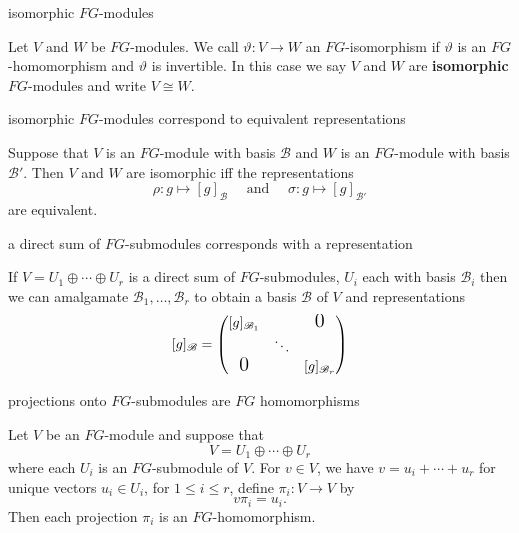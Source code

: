 \documentclass[avery5371,grid]{flashcards}
\newcommand{\B}{\mathscr{B}}
\renewcommand{\le}{\leqslant}
\renewcommand{\theta}{\vartheta}
\newcommand{\iso}{\cong}
\newcommand{\defn}[1]{\textbf{#1}}
\begin{document}
\begin{flashcard}[Definition 7.4]{isomorphic $FG$-modules}

  Let $V$ and $W$ be $FG$-modules. We call $\theta : V \to W$ an
  $FG$-isomorphism if $\theta$ is an $FG$-homomorphism and $\theta$ is
  invertible. In this case we say $V$ and $W$ are \defn{isomorphic}
  $FG$-modules and write $V \iso W$.

\end{flashcard}

\begin{flashcard}[Theorem 7.6]{isomorphic $FG$-modules correspond to
    equivalent representations}

  Suppose that $V$ is an $FG$-module with basis $\B$ and $W$ is an
  $FG$-module with basis $\B'$. Then $V$ and $W$ are isomorphic iff
  the representations
  \[
    \rho : g \mapsto [g]_{\B} \quad \text{ and } \quad
    \sigma : g \mapsto [g]_{\B'}
  \]
  are equivalent.

\end{flashcard}

\begin{flashcard}[Definition 7.10]{a direct sum of $FG$-submodules
    corresponds with a representation}

  If $V = U_1 \oplus \cdots \oplus U_r$ is a direct sum of
  $FG$-submodules, $U_i$ each with basis $\B_i$ then we can amalgamate
  $\B_1, \ldots, \B_r$ to obtain a basis $\B$ of $V$ and
  representations
  \[
    [g]_{\B} =
    \begin{pmatrix}
      [g]_{\B_1} & & \mbox{\Large{0}} \\
      & \ddots & \\
      \mbox{\Large{0}} & & [g]_{\B_r}
    \end{pmatrix}
  \]

\end{flashcard}

\begin{flashcard}[Proposition 7.11]{projections onto $FG$-submodules
    are $FG$ homomorphisms}

  Let $V$ be an $FG$-module and suppose that
  \[
    V = U_1 \oplus \cdots \oplus U_r
  \]
  where each $U_i$ is an $FG$-submodule of $V$. For $v \in V$, we have
  $v = u_i + \cdots + u_r$ for unique vectors $u_i \in U_i$, for
  $1 \le i \le r$, define $\pi_i : V \to V$ by
  \[
    v \pi_i = u_i.
  \]
  Then each projection $\pi_i$ is an $FG$-homomorphism.

\end{flashcard}
\end{document}
